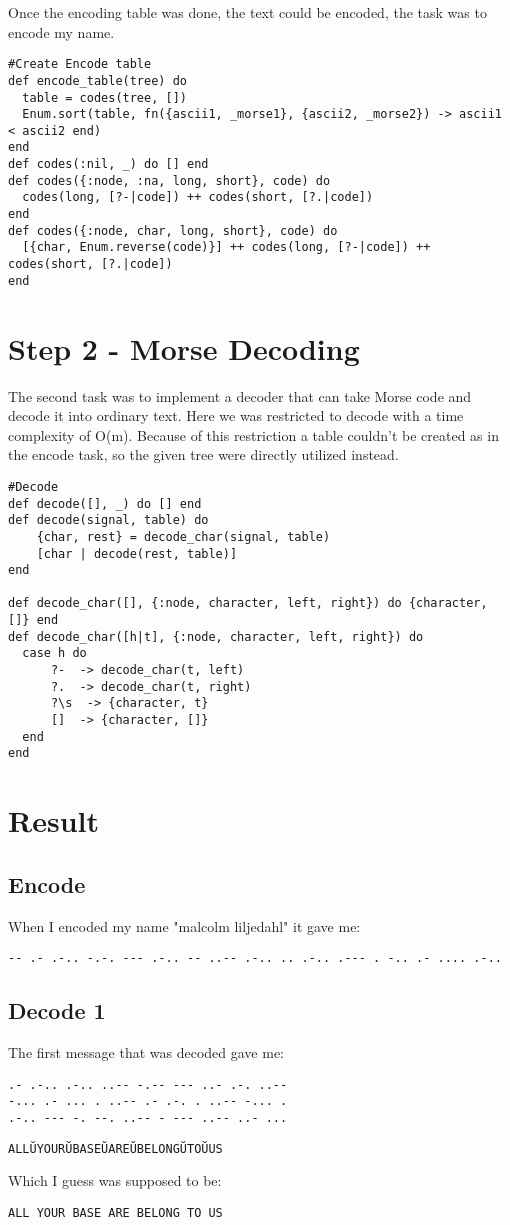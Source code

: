 \documentclass[a4paper,11pt]{article}
\begin{document}
Once the encoding table was done, the text could be encoded, the task was to encode my name.

\begin{verbatim}
#Create Encode table
def encode_table(tree) do
  table = codes(tree, [])
  Enum.sort(table, fn({ascii1, _morse1}, {ascii2, _morse2}) -> ascii1 < ascii2 end)
end
def codes(:nil, _) do [] end
def codes({:node, :na, long, short}, code) do
  codes(long, [?-|code]) ++ codes(short, [?.|code])
end
def codes({:node, char, long, short}, code) do
  [{char, Enum.reverse(code)}] ++ codes(long, [?-|code]) ++ codes(short, [?.|code])
end
\end{verbatim}

\section{Step 2 - Morse Decoding}
The second task was to implement a decoder that can take Morse code and decode it into ordinary text. Here we was restricted to decode with a time complexity of O(m). Because of this restriction a table couldn't be created as in the encode task, so the given tree were directly utilized instead.

\begin{verbatim}
#Decode
def decode([], _) do [] end
def decode(signal, table) do
    {char, rest} = decode_char(signal, table)
    [char | decode(rest, table)]
end

def decode_char([], {:node, character, left, right}) do {character, []} end
def decode_char([h|t], {:node, character, left, right}) do
  case h do
      ?-  -> decode_char(t, left)
      ?.  -> decode_char(t, right)
      ?\s  -> {character, t}
      []  -> {character, []}
  end
end
\end{verbatim}

\section{Result}
\subsection{Encode}
When I encoded my name "malcolm liljedahl" it gave me:

\begin{verbatim}
-- .- .-.. -.-. --- .-.. -- ..-- .-.. .. .-.. .--- . -.. .- .... .-.. 
\end{verbatim}

\subsection{Decode 1}
The first message that was decoded gave me:
\begin{verbatim}
.- .-.. .-.. ..-- -.-- --- ..- .-. ..-- 
-... .- ... . ..-- .- .-. . ..-- -... . 
.-.. --- -. --. ..-- - --- ..-- ..- ... 
\end{verbatim}
\begin{verbatim}
ALLŬYOURŬBASEŬAREŬBELONGŬTOŬUS
\end{verbatim}
Which I guess was supposed to be:
\begin{verbatim}
ALL YOUR BASE ARE BELONG TO US 
\end{verbatim}
\end{document}
